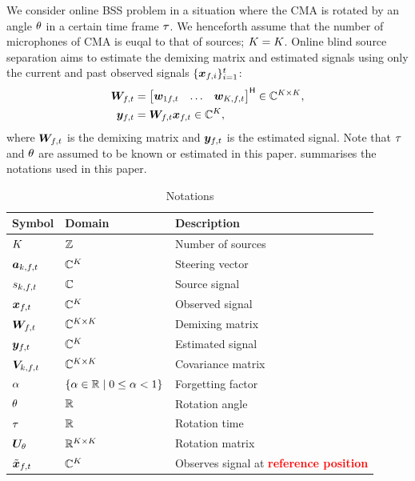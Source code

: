 \documentclass[sip,biber]{now-journal}
\begin{document}
\renewcommand{\Mic}{\Src}%
We consider online BSS problem in a situation where the CMA is rotated by an angle $\theta$ in a certain time frame $\tau$.
We henceforth assume that the number of microphones of CMA is euqal to that of sources; $\Mic = \Src$.
Online blind source separation aims to estimate the demixing matrix and estimated signals using only the current and past observed signals $\{\bm{x} _{f,i}\}_{i=1}^{t}$:
\begin{align}
  \Demix _{\ft} &= \begin{bmatrix} \demix _{1\ft} & \dots & \demix _{\Src,\ft} \end{bmatrix} ^{\hermite} \in \C ^{\Src \times \Mic}, \\
  \Est _{\ft} &= \Demix _{\ft} \Obs _{\ft} \in \C ^{\Src},
\end{align}
where $\Demix _{\ft}$ is the demixing matrix and $\Est _{\ft}$ is the estimated signal.
Note that $\tau$ and $\theta$ are assumed to be known or estimated in this paper.
 summarises the notations used in this paper.
\begin{table}[t]
  \centering
  \caption{Notations}\label{tab:notations}
  \begin{tabular}{lll}
    \toprule
      Symbol & Domain & Description \\
    \midrule
      $K$               & $\mathbb{Z}$                     & Number of sources \\
      $\steer _{\src,\ft}$ & $\C ^{\Mic}$             & Steering vector \\
      $\sig _{\src,\ft}$   & $\mathbb{C}$                     & Source signal \\
      $\Obs _{\ft}$        & $\C^{\Mic}$              & Observed signal \\
      $\Demix _{\ft}$      & $\C^{\Src \times \Mic}$  & Demixing matrix \\
      $\Est _{\ft}$        & $\C^{\Mic}$              & Estimated signal \\
      $\cov _{\src,\ft}$   & $\C^{\Mic \times \Mic}$  & Covariance matrix \\
      $\alpha$            & $\{\alpha \in \mathbb{R} \mid 0 \leq \alpha < 1\}$   & Forgetting factor \\
      $\theta$            & $\mathbb{R}$                     & Rotation angle \\
      $\tau$            & $\mathbb{R}$                     & Rotation time \\
      $\bm{U} _{\theta}$ & $\R ^{\Mic \times \Mic}$ & Rotation matrix \\
      $\irot{\Obs} _{\ft}$ & $\C^{\Mic}$              & Observes signal at \textcolor{red}{\textbf{reference position}} \\
    \bottomrule
  \end{tabular}
\end{table}
\end{document}
